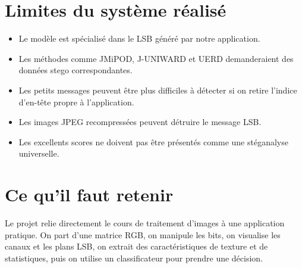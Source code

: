 \documentclass[11pt,a4paper]{article}
\begin{document}
\section{Limites du système réalisé}
\begin{itemize}
  \item Le modèle est spécialisé dans le LSB généré par notre application.
  \item Les méthodes comme JMiPOD, J-UNIWARD et UERD demanderaient des données stego correspondantes.
  \item Les petits messages peuvent être plus difficiles à détecter si on retire l'indice d'en-tête propre à l'application.
  \item Les images JPEG recompressées peuvent détruire le message LSB.
  \item Les excellents scores ne doivent pas être présentés comme une stéganalyse universelle.
\end{itemize}

\section{Ce qu'il faut retenir}
Le projet relie directement le cours de traitement d'images à une application pratique. On part d'une matrice RGB, on manipule les bits, on visualise les canaux et les plans LSB, on extrait des caractéristiques de texture et de statistiques, puis on utilise un classificateur pour prendre une décision.
\end{document}
